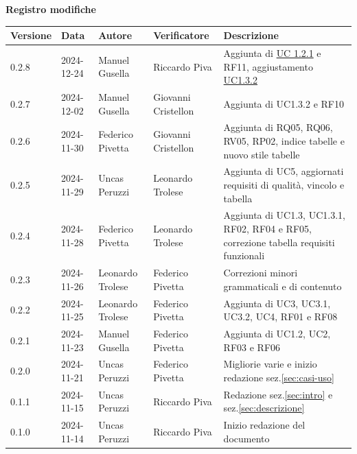 \documentclass[11pt]{article}
\begin{document}
\centering\textbf{Registro modifiche}\\
\vspace{2mm}
\begin{tabularx}{\textwidth}{|l|l|l|l|X|}
\hline
\textbf{Versione} & \textbf{Data} & \textbf{Autore} & \textbf{Verificatore} & \textbf{Descrizione} \\
\hline
0.2.8 & 2024-12-24 & Manuel Gusella & Riccardo Piva & Aggiunta di \hyperref[UC1.2.1]{UC 1.2.1} e RF11, aggiustamento \hyperref[UC1.3.2]{UC1.3.2} \\
\hline
0.2.7 & 2024-12-02 & Manuel Gusella & Giovanni Cristellon & Aggiunta di UC1.3.2 e RF10 \\
\hline
0.2.6 & 2024-11-30 & Federico Pivetta & Giovanni Cristellon & Aggiunta di RQ05, RQ06, RV05, RP02, indice tabelle e nuovo stile tabelle \\
\hline
0.2.5 & 2024-11-29 & Uncas Peruzzi & Leonardo Trolese & Aggiunta di UC5, aggiornati requisiti di qualità, vincolo e tabella \\
\hline
0.2.4 & 2024-11-28 & Federico Pivetta & Leonardo Trolese & Aggiunta di UC1.3, UC1.3.1, RF02, RF04 e RF05, correzione tabella requisiti funzionali \\
\hline
0.2.3 & 2024-11-26 & Leonardo Trolese  & Federico Pivetta & Correzioni minori grammaticali e di contenuto \\
\hline
0.2.2 & 2024-11-25 & Leonardo Trolese  & Federico Pivetta & Aggiunta di UC3, UC3.1, UC3.2, UC4, RF01 e RF08 \\
\hline
0.2.1 & 2024-11-23 & Manuel Gusella  & Federico Pivetta & Aggiunta di UC1.2, UC2, RF03 e RF06\\
\hline
0.2.0 & 2024-11-21 & Uncas Peruzzi  & Federico Pivetta & Migliorie varie e inizio redazione sez.\ref{sec:casi-uso} \\
\hline
0.1.1 & 2024-11-15 & Uncas Peruzzi  & Riccardo Piva & Redazione sez.\ref{sec:intro} e sez.\ref{sec:descrizione} \\
\hline
0.1.0 & 2024-11-14 & Uncas Peruzzi  & Riccardo Piva & Inizio redazione del documento\\
\hline
\end{tabularx}

\newpage
\tableofcontents
\newpage
\listoffigures
\newpage
\listoftables
\end{document}
